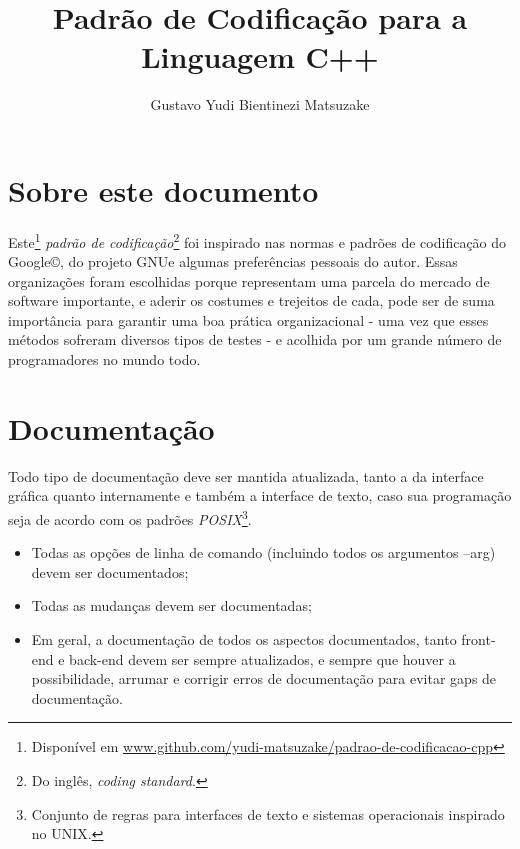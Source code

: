 \documentclass{article}
\begin{document}
\title{Padrão de Codificação para a Linguagem C++}
\author{Gustavo Yudi Bientinezi Matsuzake}
\maketitle



\section{Sobre este documento}

Este\footnote{Disponível em \url{www.github.com/yudi-matsuzake/padrao-de-codificacao-cpp}} \emph{padrão de codificação}\footnote{Do inglês, \emph{coding standard}.} foi inspirado nas normas e padrões de codificação do Google\copyright, do projeto GNU\textcopyleft e algumas preferências pessoais do autor. Essas organizações foram escolhidas porque representam uma parcela do mercado de software importante, e aderir os costumes e trejeitos de cada, pode ser de suma importância para garantir uma boa prática organizacional - uma vez que esses métodos sofreram diversos tipos de testes - e acolhida por um grande número de programadores no mundo todo.

\section{Documentação}

Todo tipo de documentação deve ser mantida atualizada, tanto a da interface gráfica quanto internamente e também a interface de texto, caso sua programação seja de acordo com os padrões \emph{POSIX}\footnote{Conjunto de regras para interfaces de texto e sistemas operacionais inspirado no UNIX.}.

\begin{itemize}
\item Todas as opções de linha de comando (incluindo todos os argumentos --arg) devem ser documentados;
\item Todas as mudanças devem ser documentadas;
\item Em geral, a documentação de todos os aspectos documentados, tanto front-end e back-end devem ser sempre atualizados, e sempre que houver a possibilidade, arrumar e corrigir erros de documentação para evitar gaps de documentação.
\end{itemize}
\end{document}
